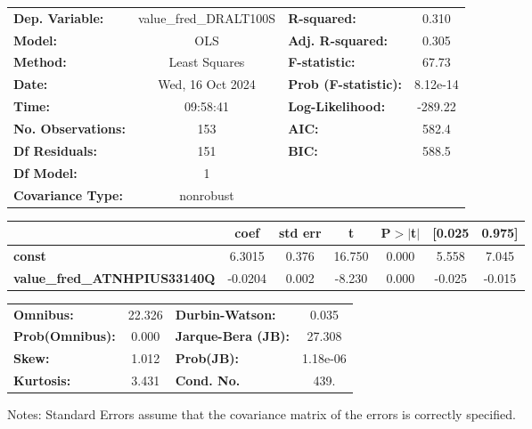 \begin{center}
\begin{tabular}{lclc}
\toprule
\textbf{Dep. Variable:}              & value\_fred\_DRALT100S & \textbf{  R-squared:         } &     0.310   \\
\textbf{Model:}                      &          OLS           & \textbf{  Adj. R-squared:    } &     0.305   \\
\textbf{Method:}                     &     Least Squares      & \textbf{  F-statistic:       } &     67.73   \\
\textbf{Date:}                       &    Wed, 16 Oct 2024    & \textbf{  Prob (F-statistic):} &  8.12e-14   \\
\textbf{Time:}                       &        09:58:41        & \textbf{  Log-Likelihood:    } &   -289.22   \\
\textbf{No. Observations:}           &            153         & \textbf{  AIC:               } &     582.4   \\
\textbf{Df Residuals:}               &            151         & \textbf{  BIC:               } &     588.5   \\
\textbf{Df Model:}                   &              1         & \textbf{                     } &             \\
\textbf{Covariance Type:}            &       nonrobust        & \textbf{                     } &             \\
\bottomrule
\end{tabular}
\begin{tabular}{lcccccc}
                                     & \textbf{coef} & \textbf{std err} & \textbf{t} & \textbf{P$> |$t$|$} & \textbf{[0.025} & \textbf{0.975]}  \\
\midrule
\textbf{const}                       &       6.3015  &        0.376     &    16.750  &         0.000        &        5.558    &        7.045     \\
\textbf{value\_fred\_ATNHPIUS33140Q} &      -0.0204  &        0.002     &    -8.230  &         0.000        &       -0.025    &       -0.015     \\
\bottomrule
\end{tabular}
\begin{tabular}{lclc}
\textbf{Omnibus:}       & 22.326 & \textbf{  Durbin-Watson:     } &    0.035  \\
\textbf{Prob(Omnibus):} &  0.000 & \textbf{  Jarque-Bera (JB):  } &   27.308  \\
\textbf{Skew:}          &  1.012 & \textbf{  Prob(JB):          } & 1.18e-06  \\
\textbf{Kurtosis:}      &  3.431 & \textbf{  Cond. No.          } &     439.  \\
\bottomrule
\end{tabular}
\end{center}

Notes: \newline
 [1] Standard Errors assume that the covariance matrix of the errors is correctly specified.